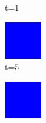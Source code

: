 \documentclass[a4paper, 11pt]{article}
\begin{document}
\begin{landscape}
\begin{figure}[H]
\begin{subfigure}{.26\textwidth}
  \caption{t=1}
\end{subfigure}%
\begin{subfigure}{.26\textwidth}
  \centering
  \includegraphics[width=0.9\linewidth]{PRISONERS_DILEMMA_MOORE_12x12_t05}
  \caption{t=5}
\end{subfigure}%
\begin{subfigure}{.26\textwidth}
  \centering
  \includegraphics[width=0.9\linewidth]{PRISONERS_DILEMMA_MOORE_12x12_t10}

\end{subfigure}
\end{figure}
\end{landscape}
\end{document}
